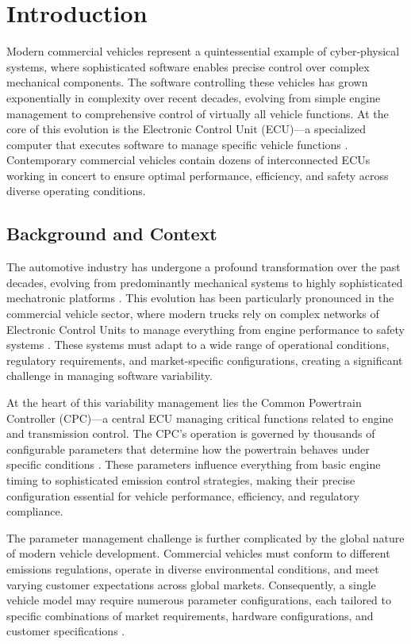 \chapter{Introduction}
\label{chap:introduction}

Modern commercial vehicles represent a quintessential example of cyber-physical systems, where sophisticated software enables precise control over complex mechanical components. The software controlling these vehicles has grown exponentially in complexity over recent decades, evolving from simple engine management to comprehensive control of virtually all vehicle functions. At the core of this evolution is the Electronic Control Unit (ECU)—a specialized computer that executes software to manage specific vehicle functions \cite{broy2006challenges}. Contemporary commercial vehicles contain dozens of interconnected ECUs working in concert to ensure optimal performance, efficiency, and safety across diverse operating conditions.

\section{Background and Context}
\label{sec:background}

The automotive industry has undergone a profound transformation over the past decades, evolving from predominantly mechanical systems to highly sophisticated mechatronic platforms \cite{pretschner2007software}. This evolution has been particularly pronounced in the commercial vehicle sector, where modern trucks rely on complex networks of Electronic Control Units to manage everything from engine performance to safety systems \cite{broy2006challenges}. These systems must adapt to a wide range of operational conditions, regulatory requirements, and market-specific configurations, creating a significant challenge in managing software variability.

At the heart of this variability management lies the Common Powertrain Controller (CPC)—a central ECU managing critical functions related to engine and transmission control. The CPC's operation is governed by thousands of configurable parameters that determine how the powertrain behaves under specific conditions \cite{staron2021automotive}. These parameters influence everything from basic engine timing to sophisticated emission control strategies, making their precise configuration essential for vehicle performance, efficiency, and regulatory compliance.

The parameter management challenge is further complicated by the global nature of modern vehicle development. Commercial vehicles must conform to different emissions regulations, operate in diverse environmental conditions, and meet varying customer expectations across global markets. Consequently, a single vehicle model may require numerous parameter configurations, each tailored to specific combinations of market requirements, hardware configurations, and customer specifications \cite{trovao2024evolution}.

